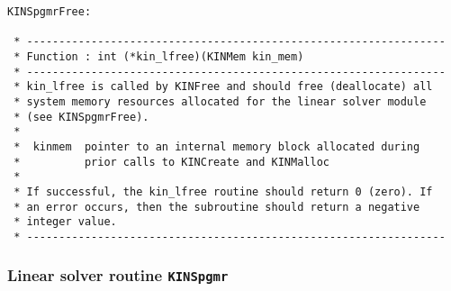 \documentclass[11pt]{article}
\begin{document}
\begin{verbatim}
KINSpgmrFree:

 * -----------------------------------------------------------------
 * Function : int (*kin_lfree)(KINMem kin_mem)
 * -----------------------------------------------------------------
 * kin_lfree is called by KINFree and should free (deallocate) all
 * system memory resources allocated for the linear solver module
 * (see KINSpgmrFree).
 *
 *  kinmem  pointer to an internal memory block allocated during
 *          prior calls to KINCreate and KINMalloc
 *
 * If successful, the kin_lfree routine should return 0 (zero). If
 * an error occurs, then the subroutine should return a negative
 * integer value.
 * -----------------------------------------------------------------

\end{verbatim}
\normalsize

\subsubsection{Linear solver routine {\tt KINSpgmr}}
\end{document}
